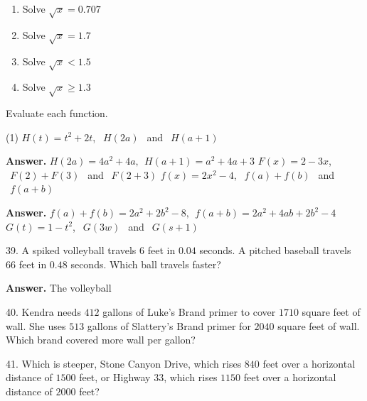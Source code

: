 \documentclass[10pt,]{book}
\theoremstyle{plain}
\theoremstyle{definition}
\theoremstyle{definition}
\theoremstyle{definition}
\theoremstyle{definition}
\numberwithin{equation}{part}
\newcommand{\lt}{<}
\begin{document}
\begin{exerciselist}
\begin{exercisegroup}
\begin{multicols}{2}
\begin{enumerate}[label=*\alph**]
\item\hypertarget{li-1597}{}Solve \(\sqrt{x} = 0.707\)%
\item\hypertarget{li-1598}{}Solve \(\sqrt{x} = 1.7\)%
\item\hypertarget{li-1599}{}Solve \(\sqrt{x}\lt 1.5 \)%
\item\hypertarget{li-1600}{}Solve \(\sqrt{x}\ge 1.3 \)%
\end{enumerate}
\end{multicols}
%
\end{exercisegroup}
\par\smallskip\noindent
\hypertarget{exercisegroup-58}{}\par\noindent Evaluate each function.%
\begin{exercisegroup}(1)
\exercise[35.]\hypertarget{exercise-431}{}\(H(t)=t^2+2t\), \(~~H(2a)~~\) and \(~~H(a+1)\)%
\par\smallskip
\noindent\textbf{Answer.}\hypertarget{answer-239}{}\quad
\(H(2a) =4a^2 + 4a, ~~H(a+1) =a^2+4a+3\)%
\exercise[36.]\hypertarget{exercise-432}{}\(F(x)=2-3x\), \(~~F(2)+F(3)~~\) and \(~~F(2+3)\)%
\exercise[37.]\hypertarget{exercise-433}{}\(f(x)=2x^2-4 \), \(~~f(a)+f(b)~~\) and \(~~f(a+b)\)%
\par\smallskip
\noindent\textbf{Answer.}\hypertarget{answer-240}{}\quad
\(f (a) + f (b) = 2a^2 + 2b^2 - 8, ~~f (a + b) = 2a^2 + 4ab + 2b^2 - 4\)%
\exercise[38.]\hypertarget{exercise-434}{}\(G(t)=1-t^2 \), \(~~G(3w)~~\) and \(~~G(s+1)\)%
\end{exercisegroup}
\par\smallskip\noindent
\item[39.]\hypertarget{exercise-435}{}A spiked volleyball travels \(6\) feet in \(0.04\) seconds. A pitched baseball travels \(66\) feet in \(0.48\) seconds. Which ball travels faster?%
\par\smallskip
\par\smallskip
\noindent\textbf{Answer.}\hypertarget{answer-241}{}\quad
The volleyball%
\item[40.]\hypertarget{exercise-436}{}Kendra needs \(412\) gallons of Luke's Brand primer to cover \(1710\) square feet of wall. She uses \(513\) gallons of Slattery's Brand primer for \(2040\) square feet of wall. Which brand covered more wall per gallon?%
\par\smallskip
\item[41.]\hypertarget{exercise-437}{}Which is steeper, Stone Canyon Drive, which rises \(840\) feet over a horizontal distance of \(1500\) feet, or Highway 33, which rises \(1150\) feet over a horizontal distance of \(2000\) feet?%

\end{exerciselist}
\end{document}
